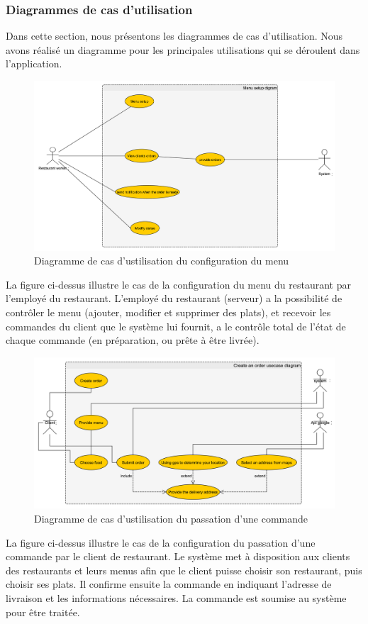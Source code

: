 \documentclass[french, a4paper, 12pt]{report}
\begin{document}
		\newpage
		\subsubsection{Diagrammes de cas d’utilisation} Dans cette section, nous présentons les diagrammes de cas d'utilisation. Nous avons réalisé un diagramme pour les principales utilisations qui se déroulent dans l'application. 
		
			
			\begin{figure}[!h]
  				\center
  				\includegraphics[width=15cm]{usecasemenu.png}
  				\caption{Diagramme de cas d'ustilisation du configuration du menu}
  				\label{fig:usecasemenu}
			\end{figure}
			
			La figure ci-dessus illustre le cas de la configuration du menu du restaurant par l'employé du restaurant. L'employé du restaurant (serveur) a la possibilité de contrôler
le menu (ajouter, modifier et supprimer des plats), et recevoir les commandes du client que le système lui fournit,
a le contrôle total de l'état de chaque commande (en préparation, ou prête à être livrée).
			
			\newpage
			\begin{figure}[!h]
  				\center
  				\includegraphics[width=15cm]{usecaseorder.png}
  				\caption{Diagramme de cas d'ustilisation du passation d'une commande}
  				\label{fig:usecaseorder}
			\end{figure}
			La figure ci-dessus illustre le cas de la configuration du passation d'une commande par le client de restaurant. Le système met à disposition aux clients des restaurants et leurs menus afin que le client puisse choisir son restaurant,
puis choisir ses plats. Il confirme ensuite la commande en indiquant l'adresse de livraison et les informations nécessaires. La commande est soumise au système pour être traitée.
			
\end{document}
